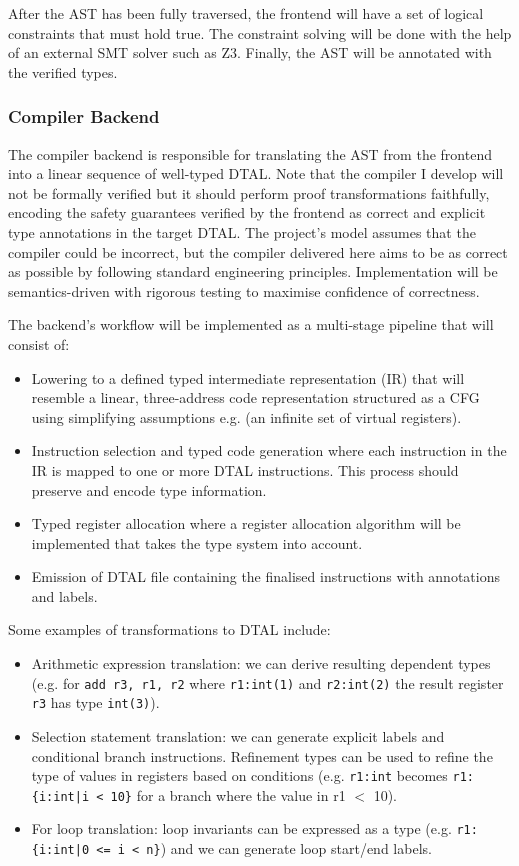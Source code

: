 \documentclass[a4paper, 12pt]{article}
\begin{document}
After the AST has been fully traversed, the frontend will have a set of logical constraints that must hold true. The constraint solving will be done with the help of an external SMT solver such as Z3. Finally, the AST will be annotated with the verified types. %

\subsubsection*{Compiler Backend}

The compiler backend is responsible for translating the AST from the frontend into a linear sequence of well-typed DTAL. Note that the compiler I develop will not be formally verified but it should perform proof transformations faithfully, encoding the safety guarantees verified by the frontend as correct and explicit type annotations in the target DTAL. The project's model assumes that the compiler could be incorrect, but the compiler delivered here aims to be as correct as possible by following standard engineering principles. Implementation will be semantics-driven with rigorous testing to maximise confidence of correctness.

The backend's workflow will be implemented as a multi-stage pipeline that will consist of:
\begin{itemize}
  \item Lowering to a defined typed intermediate representation (IR) that will resemble a linear, three-address code representation structured as a CFG using simplifying assumptions e.g. (an infinite set of virtual registers).
  \item Instruction selection and typed code generation where each instruction in the IR is mapped to one or more DTAL instructions. This process should preserve and encode type information.
  \item Typed register allocation where a register allocation algorithm will be implemented that takes the type system into account.
  \item Emission of DTAL file containing the finalised instructions with annotations and labels.
\end{itemize}

Some examples of transformations to DTAL include:

\begin{itemize}
  \item Arithmetic expression translation: we can derive resulting dependent types (e.g. for \texttt{add r3, r1, r2} where \texttt{r1:int(1)} and \texttt{r2:int(2)} the result register \texttt{r3} has type \texttt{int(3)}).
  \item Selection statement translation: we can generate explicit labels and conditional branch instructions. Refinement types can be used to refine the type of values in registers based on conditions (e.g. \texttt{r1:int} becomes \texttt{r1:\{i:int|i < 10\}} for a branch where the value in r1 $<$ 10).
  \item For loop translation: loop invariants can be expressed as a type (e.g. \texttt{r1:\{i:int|0 <= i < n\}}) and we can generate loop start/end labels.
\end{itemize}
\end{document}
